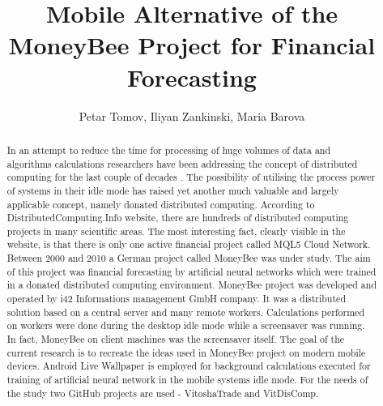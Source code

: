 \documentclass{llncs}
\begin{document}
\title{Mobile Alternative of the MoneyBee Project for Financial Forecasting} 

\author{Petar Tomov, Iliyan Zankinski, Maria Barova}




\maketitle


\begin{abstract}
In an attempt to reduce the time for processing of huge volumes of data and algorithms calculations researchers have been addressing the concept of distributed computing for the last couple of decades \cite{balabanov01,balabanov02}. The possibility of utilising the process power of systems in their idle mode has raised yet another much valuable and largely applicable concept, namely donated distributed computing. According to DistributedComputing.Info website, there are hundreds of distributed computing projects in many scientific areas. The most interesting fact, clearly visible in the website, is that there is only one active financial project called MQL5 Cloud Network. Between 2000 and 2010 a German project called MoneyBee was under study. The aim of this project was financial forecasting by artificial neural networks which were trained in a donated distributed computing environment. MoneyBee project was developed and operated by i42 Informations management GmbH company. It was a distributed solution based on a central server and many remote workers. Calculations performed on workers were done during the desktop idle mode while a screensaver was running. In fact, MoneyBee on client machines was the screensaver itself. The goal of the current research is to recreate the ideas used in MoneyBee project on modern mobile devices. Android Live Wallpaper is employed for background calculations executed for training of artificial neural network \cite{keremedchiev01} in the mobile systems idle mode. For the needs of the study two GitHub projects are used - VitoshaTrade and VitDisComp.

\end{abstract}
\end{document}
